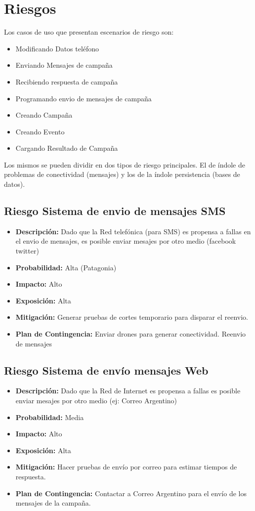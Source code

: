 \documentclass[a4paper, 11pt]{article}
\begin{document}
\newpage
\section{Riesgos}

Los casos de uso que presentan escenarios de riesgo son:
\begin{itemize}
\item Modificando Datos teléfono
\item Enviando Mensajes de campaña
\item Recibiendo respuesta de campaña
\item Programando envio de mensajes de campaña
\item Creando Campaña
\item Creando Evento
\item Cargando Resultado de Campaña
\end{itemize}
Los mismos se pueden dividir en dos tipos de riesgo principales. El de índole de problemas de conectividad (mensajes) y los de la índole persistencia (bases de datos).

\subsection{Riesgo Sistema de envio de mensajes SMS}
\begin{itemize}
\item \textbf{Descripci\'on:} Dado que la Red telefónica (para SMS) es propensa a fallas en el envio de mensajes, es posible enviar mesajes por otro medio (facebook twitter)
\item \textbf{Probabilidad:} Alta (Patagonia)
\item \textbf{Impacto:} Alto
\item \textbf{Exposici\'on:} Alta
\item \textbf{Mitigaci\'on:} Generar pruebas de cortes temporario para disparar el reenvio.
\item \textbf{Plan de Contingencia:} Enviar drones para generar conectividad. Reenvio de mensajes
\end{itemize}


\subsection{Riesgo Sistema de envío mensajes Web}
\begin{itemize}
\item \textbf{Descripci\'on:} Dado que la Red de Internet es propensa a fallas es posible enviar mesajes por otro medio (ej: Correo Argentino) 
\item \textbf{Probabilidad:} Media 
\item \textbf{Impacto:} Alto
\item \textbf{Exposici\'on:} Alta
\item \textbf{Mitigaci\'on:} Hacer pruebas de env\'io por correo para estimar tiempos de respuesta. 
\item \textbf{Plan de Contingencia:} Contactar a Correo Argentino para el envío de los mensajes de la campa\~na.
\end{itemize}
\end{document}
